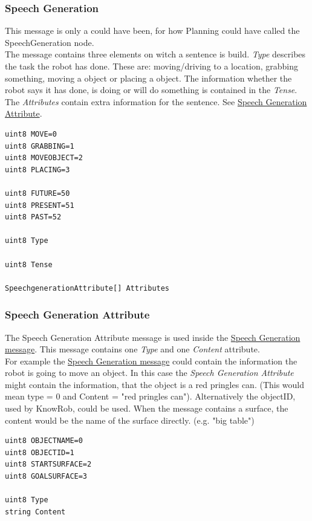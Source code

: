 \documentclass[main.tex]{subfiles}
\begin{document}
				\subsubsection{Speech Generation}
				\label{msg_speech_generation}
                
                This message is only a could have been, for how Planning could have called the SpeechGeneration node.\\
                The message contains three elements on witch a sentence is build. \textit{Type} describes the task the robot has done. These are: moving/driving to a location, grabbing something, moving a object or placing a object. The information whether the robot says it has done, is doing or will do something is contained in the \textit{Tense}. The \textit{Attributes} contain extra information for the sentence. See \hyperref[msg_speech_generation_attribute]{Speech Generation Attribute}.
                
				
					\begin{lstlisting}
uint8 MOVE=0
uint8 GRABBING=1
uint8 MOVEOBJECT=2
uint8 PLACING=3
		
uint8 FUTURE=50
uint8 PRESENT=51
uint8 PAST=52
		
uint8 Type
		
uint8 Tense
		
SpeechgenerationAttribute[] Attributes
\end{lstlisting}
				\subsubsection{Speech Generation Attribute}
				\label{msg_speech_generation_attribute}
				The Speech Generation Attribute message is used inside the \hyperref[msg_speech_generation]{Speech Generation message}. This message contains one \textit{Type} and one \textit{Content} attribute.\\
                For example the \hyperref[msg_speech_generation]{Speech Generation message} could contain the information the robot is going to move an object. In this case the \textit{Speech Generation Attribute} might contain the information, that the object is a red pringles can. (This would mean type = 0 and Content = "red pringles can"). Alternatively the objectID, used by KnowRob, could be used. When the message contains a surface, the content would be the name of the surface directly. (e.g. "big table")
                
					\begin{lstlisting}
uint8 OBJECTNAME=0
uint8 OBJECTID=1
uint8 STARTSURFACE=2
uint8 GOALSURFACE=3
					
uint8 Type
string Content
\end{lstlisting}
\end{document}
